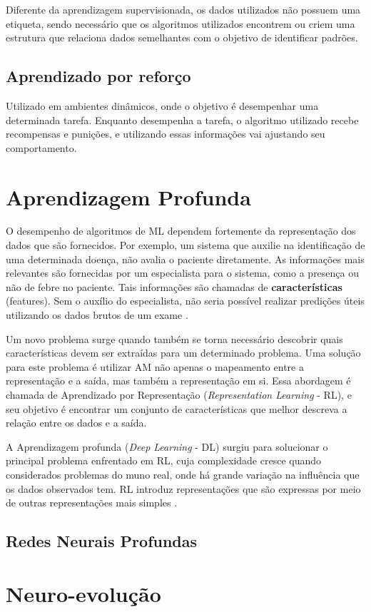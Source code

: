 \documentclass[12pt]{article}
\begin{document}
Diferente da aprendizagem supervisionada, os dados utilizados não possuem uma etiqueta, sendo necessário que os algoritmos utilizados encontrem ou criem uma estrutura que relaciona dados semelhantes com o objetivo de identificar padrões.


\subsection{Aprendizado por reforço}


Utilizado em ambientes dinâmicos, onde o objetivo é desempenhar uma determinada tarefa. Enquanto desempenha a tarefa, o algoritmo utilizado recebe recompensas e punições, e utilizando essas informações vai ajustando seu comportamento.


\section{Aprendizagem Profunda}


O desempenho de algoritmos de ML dependem fortemente da representação dos dados que são fornecidos. Por exemplo, um sistema que auxilie na identificação de uma determinada doença, não avalia o paciente diretamente. As informações mais relevantes são fornecidas por um especialista para o sistema, como a presença ou não de febre no paciente. Tais informações são chamadas de \textbf{características} (features). Sem o auxílio do especialista, não seria possível realizar predições úteis utilizando os dados brutos de um exame \cite{goodfellow2016deep}.


Um novo problema surge quando também se torna necessário descobrir quais características devem ser extraídas para um determinado problema. Uma solução para este problema é utilizar AM não apenas o mapeamento entre a representação e a saída, mas também a representação em si. Essa abordagem é chamada de Aprendizado por Representação (\textit{Representation Learning} - RL), e seu objetivo é encontrar um conjunto de características que melhor descreva a relação entre os dados e a saída. 


A Aprendizagem profunda (\textit{Deep Learning} - DL) surgiu para solucionar o principal problema enfrentado em RL, cuja complexidade cresce quando considerados problemas do muno real, onde há grande variação na influência que os dados observados tem. RL introduz representações que são expressas por meio de outras representações mais simples \cite{goodfellow2016deep}.


\subsection{Redes Neurais Profundas}

\section{Neuro-evolução}



\end{document}
